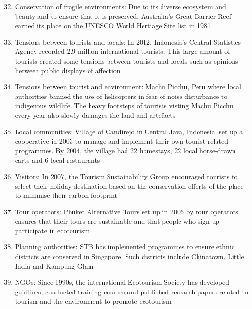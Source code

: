 \documentclass[oneside]{book}
\begin{document}
\begin{minipage}{0.5\textwidth}
  \begin{enumerate}
    \setcounter{enumi}{31}
    \item Conservation of fragile environments: Due to its diverse ecosystem and beauty and to ensure that it is preserved, Australia’s Great Barrier Reef earned its place on the UNESCO World Hertiage Site list in 1981
    
    \item Tensions between tourists and locals: In 2012, Indonesia’s Central Statistics Agency recorded 2.9 million international tourists. This large amount of tourists created some tensions between tourists and locals such as opinions between public displays of affection
    
    \item Tensions between tourist and environment: Machu Picchu, Peru where local authorities banned the use of helicopters in fear of noise disturbance to indigenous wildlife. The heavy footsteps of tourists visting Machu Picchu every year also slowly damages the land and artefacts
    
    \item Local communities: Village of Candirejo in Central Java, Indonesia, set up a cooperative in 2003 to manage and implement their own tourist-related programmes. By 2004, the village had 22 homestays, 22 local horse-drawn carts and 6 local restaurants
    
    \item Visitors: In 2007, the Tourism Sustainability Group encouraged tourists to select their holiday destination based on the conservation efforts of the place to minimise their carbon footprint
    
    \item Tour operators: Phuket Alternative Tours set up in 2006 by tour operators ensures that their tours are sustainable and that people who sign up participate in ecotourism
    
    \item Planning authorities: STB has implemented programmes to ensure ethnic districts are conserved in Singapore. Such districts include Chinatown, Little India and Kampung Glam
    
    \item NGOs: Since 1990s, the international Ecotourism Society has developed guidlines, conducted training courses and published research papers related to tourism and the environment to promote ecotourism
  \end{enumerate}
  \vspace{0.4cm}
\end{minipage}
\end{document}
